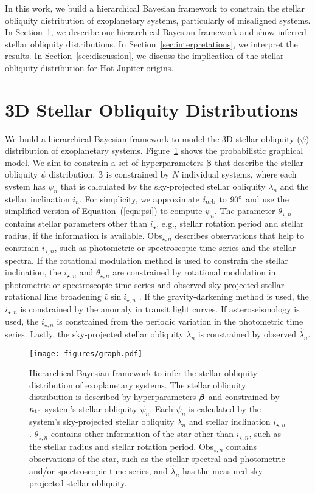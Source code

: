 \documentclass[twocolumn,times]{aastex631}
\begin{document}
In this work, we build a hierarchical Bayesian framework to constrain the stellar obliquity distribution of exoplanetary systems, particularly of misaligned systems.
In Section~\ref{sec:hbm}, we describe our hierarchical Bayesian framework and show inferred stellar obliquity distributions. 
In Section~\ref{sec:interpretations}, we interpret the results. 
In Section~\ref{sec:discussion}, we discuss the implication of the stellar obliquity distribution for Hot Jupiter origins.

\section{3D Stellar Obliquity Distributions} \label{sec:hbm}
We build a hierarchical Bayesian framework to model the 3D stellar obliquity ($\psi$) distribution of exoplanetary systems. Figure~\ref{fig:graph} shows the probabilistic graphical model. We aim to constrain a set of hyperparameters $\bm{\beta}$ that describe the stellar obliquity $\psi$ distribution. $\bm{\beta}$ is constrained by $N$ individual systems, where each system has $\psi_n$ that is calculated by the sky-projected stellar obliquity $\lambda_n$ and the stellar inclination $i_n$. For simplicity, we approximate $i_{\rm orb}$ to $90\mbox{$^\circ$}$ and use the simplified version of Equation~(\ref{eqn:psi}) to compute $\psi_n$.
The parameter $\theta_{\star, n}$ contains stellar parameters other than $i_\star$, e.g., stellar rotation period and stellar radius, if the information is available.
Obs$_{\star,n}$ describes observations that help to constrain $i_{\star,n}$, such as photometric or spectroscopic time series and the stellar spectra. If the rotational modulation method is used to constrain the stellar inclination, the $i_{\star,n}$ and $\theta_{\star,n}$ are constrained by rotational modulation in photometric or spectroscopic time series and observed sky-projected stellar rotational line broadening $\hat{v}\sin{i_{\star,n}}$ \citep[e.g.,][]{Masuda20}. If the gravity-darkening method is used, the $i_{\star,n}$ is constrained by the anomaly in transit light curves. If asteroseismology is used, the $i_{\star,n}$ is constrained from the periodic variation in the photometric time series.
Lastly, the sky-projected stellar obliquity $\lambda_n$ is constrained by observed $\hat{\lambda}_n$.

\begin{figure}[ht!]
    \texttt{[image: figures/graph.pdf]}
    \caption{Hierarchical Bayesian framework to infer the stellar obliquity distribution of exoplanetary systems. The stellar obliquity distribution is described by hyperparameters $\vb*{\beta}$ and constrained by $n_{\rm th}$ system's stellar obliquity $\psi_n$. Each $\psi_n$ is calculated by the system's sky-projected stellar obliquity $\lambda_n$ and stellar inclination $i_{\star, n}$. $\theta_{\star, n}$ contains other information of the star other than $i_{\star, n}$, such as the stellar radius and stellar rotation period. Obs$_{\star,n}$ contains observations of the star, such as the stellar spectral and photometric and/or spectroscopic time series, and $\hat{\lambda}_n$ has the measured sky-projected stellar obliquity.}
    \label{fig:graph}
\end{figure}
\end{document}
